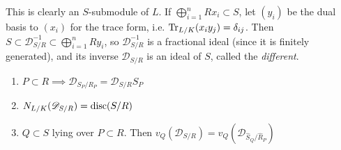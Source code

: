 \documentclass[10pt,a4paper]{article}
\begin{document}
This is clearly an $S$-submodule of $L$. If $\bigoplus_{i=1}^n Rx_i \subset S$, let $(y_i)$ be the dual basis to $(x_i)$ for the trace form, i.e. $\operatorname{Tr}_{L/K}(x_iy_j) = \delta_{ij}$. Then $S \subset \mathscr{D}_{S/R}^{-1} \subset \bigoplus_{i=1}^n Ry_i$, so $\mathscr{D}_{S/R}^{-1}$ is a fractional ideal (since it is finitely generated), and its inverse $\mathscr{D}_{S/R}$ is an ideal of $S$, called the \emph{different}.
\begin{proposition}\hspace*{0cm}
  \begin{enumerate}
    \item $P\subset R \implies \mathscr{D}_{S_P/R_P} = \mathscr{D}_{S/R}S_P$
    \item $N_{L/K}(\mathscr{D}_{S/R}) = \operatorname{disc}(S/R)$
    \item $Q \subset S$ lying over $P\subset R$. Then $v_Q(\mathscr{D}_{S/R}) = v_Q(\mathscr{D}_{\hat{S}_Q/\hat{R}_P})$
  \end{enumerate}
\end{proposition}
\end{document}
